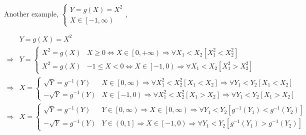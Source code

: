 \documentclass[
]{book}
\theoremstyle{definition}
\theoremstyle{definition}
\theoremstyle{definition}
\theoremstyle{definition}
\theoremstyle{remark}
\begin{document}
\[
\tag*{$\Box$}
\]

Another example, \(\begin{cases}
Y=g\left(X\right)=X^{2}\\
X\in\left[-1,\infty\right)
\end{cases}\),

\[
\begin{aligned}
 & Y=g\left(X\right)=X^{2}\\
\Rightarrow & Y=\begin{cases}
X^{2}=g\left(X\right) & X\ge0\Leftrightarrow X\in\left[0,+\infty\right)\Rightarrow\forall X_{{\scriptscriptstyle 1}}<X_{{\scriptscriptstyle 2}}\left[X_{{\scriptscriptstyle 1}}^{2}<X_{{\scriptscriptstyle 2}}^{2}\right]\\
X^{2}=g\left(X\right) & -1\le X<0\Leftrightarrow X\in\left[-1,0\right)\Rightarrow\forall X_{{\scriptscriptstyle 1}}<X_{{\scriptscriptstyle 2}}\left[X_{{\scriptscriptstyle 1}}^{2}>X_{{\scriptscriptstyle 2}}^{2}\right]
\end{cases}\\
\Rightarrow & X=\begin{cases}
\sqrt{Y}=g^{-1}\left(Y\right) & X\in\left[0,\infty\right)\Rightarrow\forall X_{{\scriptscriptstyle 1}}^{2}<X_{{\scriptscriptstyle 2}}^{2}\left[X_{{\scriptscriptstyle 1}}<X_{{\scriptscriptstyle 2}}\right]\Rightarrow\forall Y_{{\scriptscriptstyle 1}}<Y_{{\scriptscriptstyle 2}}\left[X_{{\scriptscriptstyle 1}}<X_{{\scriptscriptstyle 2}}\right]\\
-\sqrt{Y}=g^{-1}\left(Y\right) & X\in\left[-1,0\right)\Rightarrow\forall X_{{\scriptscriptstyle 1}}^{2}<X_{{\scriptscriptstyle 2}}^{2}\left[X_{{\scriptscriptstyle 1}}>X_{{\scriptscriptstyle 2}}\right]\Rightarrow\forall Y_{{\scriptscriptstyle 1}}<Y_{{\scriptscriptstyle 2}}\left[X_{{\scriptscriptstyle 1}}>X_{{\scriptscriptstyle 2}}\right]
\end{cases}\\
\Rightarrow & X=\begin{cases}
\sqrt{Y}=g^{-1}\left(Y\right) & Y\in\left[0,\infty\right)\Rightarrow X\in\left[0,\infty\right)\Rightarrow\forall Y_{{\scriptscriptstyle 1}}<Y_{{\scriptscriptstyle 2}}\left[g^{-1}\left(Y_{{\scriptscriptstyle 1}}\right)<g^{-1}\left(Y_{{\scriptscriptstyle 2}}\right)\right]\\
-\sqrt{Y}=g^{-1}\left(Y\right) & Y\in\left(0,1\right]\Rightarrow X\in\left[-1,0\right)\Rightarrow\forall Y_{{\scriptscriptstyle 1}}<Y_{{\scriptscriptstyle 2}}\left[g^{-1}\left(Y_{{\scriptscriptstyle 1}}\right)>g^{-1}\left(Y_{{\scriptscriptstyle 2}}\right)\right]

\end{cases}
\end{aligned}\]
\end{document}
